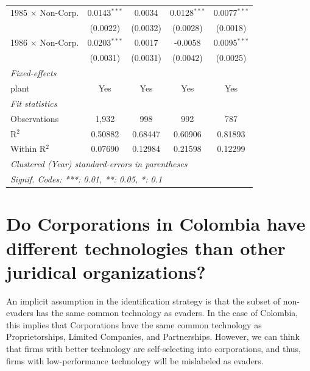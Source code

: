 \documentclass[
  12pt]{article}
\theoremstyle{definition}
\theoremstyle{remark}
\begin{document}
\begin{table}
\begin{minipage}{\linewidth}
\begin{tabular}{lcccc}
   1985 $\times$ Non-Corp.  & 0.0143$^{***}$  & 0.0034          & 0.0128$^{***}$  & 0.0077$^{***}$\\   
                            & (0.0022)        & (0.0032)        & (0.0028)        & (0.0018)\\   
   1986 $\times$ Non-Corp.  & 0.0203$^{***}$  & 0.0017          & -0.0058         & 0.0095$^{***}$\\   
                            & (0.0031)        & (0.0031)        & (0.0042)        & (0.0025)\\   
   \midrule
   \emph{Fixed-effects}\\
   plant                    & Yes             & Yes             & Yes             & Yes\\  
   \midrule
   \emph{Fit statistics}\\
   Observations             & 1,932           & 998             & 992             & 787\\  
   R$^2$                    & 0.50882         & 0.68447         & 0.60906         & 0.81893\\  
   Within R$^2$             & 0.07690         & 0.12984         & 0.21598         & 0.12299\\  
   \midrule \midrule
   \multicolumn{5}{l}{\emph{Clustered (Year) standard-errors in parentheses}}\\
   \multicolumn{5}{l}{\emph{Signif. Codes: ***: 0.01, **: 0.05, *: 0.1}}\\
\end{tabular}
\par\endgroup

\end{minipage}%

\end{table}%

\section{Do Corporations in Colombia have different technologies than
other juridical
organizations?}\label{do-corporations-in-colombia-have-different-technologies-than-other-juridical-organizations}

An implicit assumption in the identification strategy is that the subset
of non-evaders has the same common technology as evaders. In the case of
Colombia, this implies that Corporations have the same common technology
as Proprietorships, Limited Companies, and Partnerships. However, we can
think that firms with better technology are self-selecting into
corporations, and thus, firms with low-performance technology will be
mislabeled as evaders.
\end{document}
